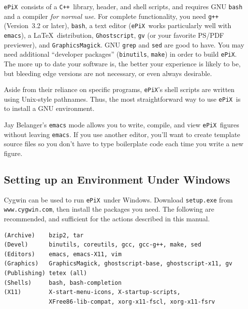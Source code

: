 \documentclass[12pt,letterpaper]{book}
\newcommand{\code}[1]{\texttt{#1}}
\newcommand{\filename}[1]{\texttt{#1}}
\newcommand{\URL}[1]{\texttt{#1}}
\newcommand{\ePiX}{\code{ePiX}}
\newcommand{\CXX}{\code{C++}}
\begin{document}
\ePiX\ consists of a \CXX\ library, header, and shell scripts, and
requires GNU \code{bash} and a compiler \emph{for normal use}.  For
complete functionality, you need \code{g++} (Version~3.2 or later),
\code{bash}, a text editor (\ePiX\ works particularly well with
\code{emacs}), a \LaTeX\ distribution, \code{Ghostscript}, \code{gv}
(or your favorite PS/PDF previewer), and \code{GraphicsMagick}. GNU
\code{grep} and \code{sed} are good to have.  You may need additional
``developer packages'' (\code{binutils}, \code{make}) in order to
build \ePiX.  The more up to date your software is, the better your
experience is likely to be, but bleeding edge versions are not
necessary, or even always desirable.

Aside from their reliance on specific programs, \ePiX's shell scripts
are written using Unix-style pathnames. Thus, the most straightforward
way to use \ePiX\ is to install a GNU environment.

Jay Belanger's \code{emacs} mode allows you to write, compile, and
view \ePiX\ figures without leaving \code{emacs}. If you use another
editor, you'll want to create template source files so you don't have
to type boilerplate code each time you write a new figure.
\index{Emacs@\code{emacs}}


\subsection{Setting up an Environment Under  Windows}

Cygwin can be used to run \ePiX\ under Windows. Download
\filename{setup.exe} from \URL{www.cygwin.com}, then install the
packages you need. The following are recommended, and sufficient for
the actions described in this manual.
\begin{verbatim}
(Archive)    bzip2, tar
(Devel)      binutils, coreutils, gcc, gcc-g++, make, sed
(Editors)    emacs, emacs-X11, vim
(Graphics)   GraphicsMagick, ghostscript-base, ghostscript-x11, gv
(Publishing) tetex (all)
(Shells)     bash, bash-completion
(X11)        X-start-menu-icons, X-startup-scripts,
             XFree86-lib-compat, xorg-x11-fscl, xorg-x11-fsrv
\end{verbatim}
\end{document}
